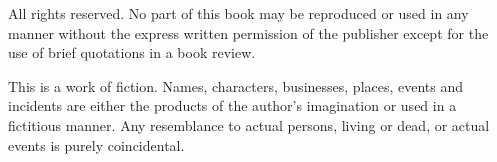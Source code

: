 \infopageany{\title}

\begingroup

\parindent=0pt

\publishercredit

\colophonfont

\bigskip
\pubcopyright

\bigskip
\pubidentification

\bigskip
All rights reserved.
No part of this book may be reproduced or used in any manner
without the express written permission of the publisher
except for the use of brief
quotations in a book review.

\bigskip
This is a work of fiction.
Names, characters, businesses, places, events and incidents
are either the products of the author's imagination
or used in a fictitious manner.
Any resemblance to actual persons, living or dead,
or actual events
is purely coincidental.

\endgroup
